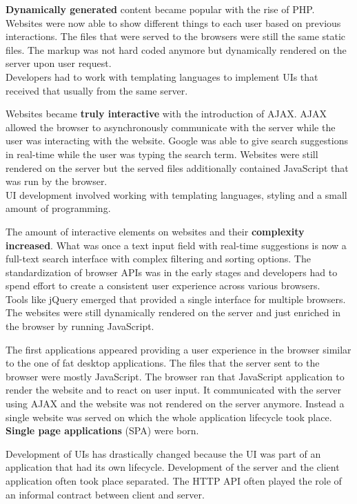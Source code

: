 \textbf{Dynamically generated} content became popular with the rise of PHP. Websites were now able to show different things to each user based on previous interactions. The files that were served to the browsers were still the same static files. The markup was not hard coded anymore but dynamically rendered on the server upon user request.
\\ Developers had to work with templating languages to implement UIs that received that usually from the same server.

Websites became \textbf{truly interactive} with the introduction of AJAX. AJAX allowed the browser to asynchronously communicate with the server while the user was interacting with the website. Google was able to give search suggestions in real-time while the user was typing the search term. Websites were still rendered on the server but the served files additionally contained JavaScript that was run by the browser.
\\ UI development involved working with templating languages, styling and a small amount of programming.

The amount of interactive elements on websites and their \textbf{complexity increased}. What was once a text input field with real-time suggestions is now a full-text search interface with complex filtering and sorting options. The standardization of browser APIs was in the early stages and developers had to spend effort to create a consistent user experience across various browsers.
\\ Tools like jQuery emerged that provided a single interface for multiple browsers. The websites were still dynamically rendered on the server and just enriched in the browser by running JavaScript.

The first applications appeared providing a user experience in the browser similar to the one of fat desktop applications. The files that the server sent to the browser were mostly JavaScript. The browser ran that JavaScript application to render the website and to react on user input. It communicated with the server using AJAX and the website was not rendered on the server anymore. Instead a single website was served on which the whole application lifecycle took place. \textbf{Single page applications} (SPA) were born.
\par Development of UIs has drastically changed because the UI was part of an application that had its own lifecycle. Development of the server and the client application often took place separated. The HTTP API often played the role of an informal contract between client and server.

